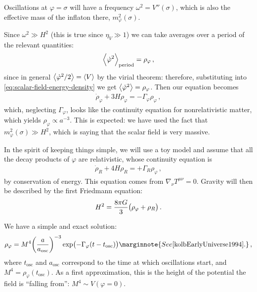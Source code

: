 \documentclass[main.tex]{subfiles}
\begin{document}
Oscillations at \(\varphi = \sigma \) will have a frequency \(\omega^2 = V''(\sigma )\), which is also the effective mass of the inflaton there, \(m^2_\varphi (\sigma )\). 

Since \(\omega^2 \gg H^2\) (this is true since \(\eta _V \gg 1\)) we can take averages over a period of the relevant quantities: 
%
\begin{align}
\expval{\dot{\varphi}^2} _{\text{period}} = \rho _\varphi 
\,,
\end{align}
%
since in general \(\expval{\dot{\varphi}^2 / 2} = \expval{V}\) by the virial theorem: therefore, substituting into \eqref{eq:scalar-field-energy-density} we get \(\expval{\dot{\varphi}^2} = \rho _\varphi \). 
Then our equation becomes 
%
\begin{align}
\dot{\rho}_\varphi + 3 H \rho _\varphi =  - \Gamma _\varphi \rho _\varphi 
\,,
\end{align}
%
which, neglecting \(\Gamma _\varphi \), looks like the continuity equation for nonrelativistic matter, which yields \(\rho _\varphi \propto a^{-3}\). 
This is expected: we have used the fact that \(m^2_\varphi (\sigma ) \gg H^2\), which is saying that the scalar field is very massive. 

In the spirit of keeping things simple, we will use a toy model and assume that all the decay products of \(\varphi \) are relativistic, whose continuity equation is 
%
\begin{align}
\dot{\rho} _R + 4 H \rho _R = + \Gamma _R \rho _\varphi 
\,,
\end{align}
%
by conservation of energy. This equation comes from \(\nabla_\nu T^{\mu \nu } = 0\). 
Gravity will then be described by the first Friedmann equation: 
%
\begin{align}
H^2 = \frac{8 \pi G}{3} \qty(\rho _\varphi + \rho _R)
\,.
\end{align}

We have a simple and exact solution: 
%
\begin{align}
\rho _\varphi = M^{4} \qty(\frac{a}{a _{\text{osc}}})^{-3} \exp(- \Gamma _\varphi \qty(t - t _{\text{osc}}))
\marginnote{See \cite[eq. 8.30]{kolbEarlyUniverse1994}.}
\,,
\end{align}
%
where \(t _{\text{osc}}\) and \(a _{\text{osc}}\) correspond to the time at which oscillations start, and \(M^{4} = \rho _\varphi ( t _{\text{osc}})\).
As a first approximation, this is the height of the potential the field is ``falling from'': \(M^{4} \sim V(\varphi = 0)\). 
\end{document}
